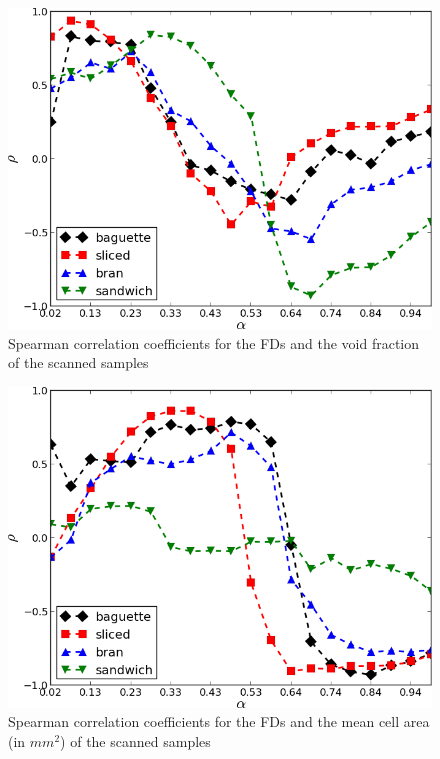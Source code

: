 



\begin{figure}[htb]
\centering
\includegraphics[scale=0.42]{../images/Fig7}
\caption{Spearman correlation coefficients for the FDs and the void fraction of the scanned samples}
\label{fig:corrVF}
\end{figure}

\begin{figure}[htb]
\centering
\includegraphics[scale=0.42]{../images/Fig8}
\caption{Spearman correlation coefficients for the FDs and the mean cell area (in $mm^{2}$) of the scanned samples}
\label{fig:corrMCA}
\end{figure}

